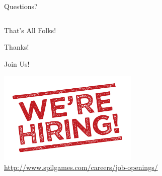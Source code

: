\documentclass[aspectratio=169]{beamer}
\begin{document}
\begin{frame}{Questions?}
\begin{columns}
\begin{column}[c]{0.5\textwidth}
        \end{column}
    \end{columns}
\end{frame}

\begin{frame}{That's All Folks!}
    \begin{center}
        \huge{Thanks!}
    \end{center}
\end{frame}

\begin{frame}{Join Us!}
    \begin{center}
        \includegraphics[width=0.5\textwidth]{images/hiring.png}\\
        \href{http://www.spilgames.com/careers/job-openings/}{\large{http://www.spilgames.com/careers/job-openings/}}
    \end{center}
\end{frame}
\end{document}

